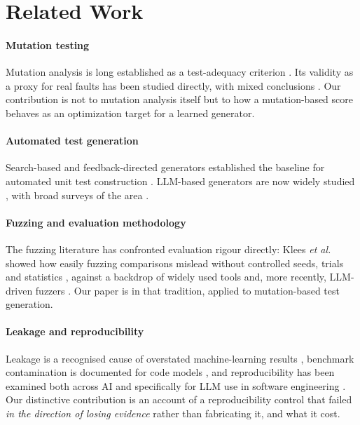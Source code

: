 \documentclass[10pt,conference]{IEEEtran}
\begin{document}
\section{Related Work}
\label{sec:related}

\paragraph{Mutation testing}
Mutation analysis is long established as a test-adequacy criterion
\cite{jia2011mutation,papadakis2019mutation}. Its validity as a proxy for real
faults has been studied directly, with mixed conclusions
\cite{just2014mutants,papadakis2018mutationscores}. Our contribution is not to
mutation analysis itself but to how a mutation-based score behaves as an
optimization target for a learned generator.

\paragraph{Automated test generation}
Search-based and feedback-directed generators established the baseline for
automated unit test construction
\cite{fraser2011evosuite,fraser2013wholesuite,pacheco2007randoop}. LLM-based
generators are now widely studied
\cite{lemieux2023codamosa,schafer2024llmunit,tufano2020athenatest}, with broad
surveys of the area \cite{wang2024testingsurvey,hou2024llmse}.

\paragraph{Fuzzing and evaluation methodology}
The fuzzing literature has confronted evaluation rigour directly: Klees
\emph{et al.} showed how easily fuzzing comparisons mislead without controlled
seeds, trials and statistics \cite{klees2018evaluating}, against a backdrop of
widely used tools \cite{serebryany2016libfuzzer,bohme2016aflfast} and, more
recently, LLM-driven fuzzers \cite{xia2024fuzz4all,deng2023titanfuzz}. Our paper
is in that tradition, applied to mutation-based test generation.

\paragraph{Leakage and reproducibility}
Leakage is a recognised cause of overstated machine-learning results
\cite{kapoor2023leakage}, benchmark contamination is documented for code models
\cite{yang2023rephrased,liu2023evalplus,chen2021codex,austin2021mbpp}, and
reproducibility has been examined both across AI
\cite{gundersen2018reproducibility,hutson2018reproducibility,pineau2021reproducibility}
and specifically for LLM use in software engineering
\cite{sallou2024threats}. Our distinctive contribution is an account of a
reproducibility control that failed \emph{in the direction of losing evidence}
rather than fabricating it, and what it cost.
\end{document}
